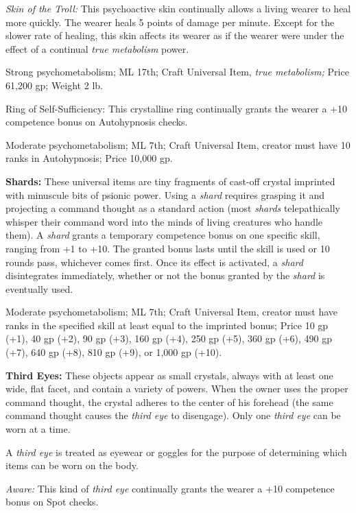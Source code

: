 \documentclass{article}
\begin{document}
\textit{Skin of the Troll: }This psychoactive skin continually allows a living 
wearer to heal more quickly. The wearer heals 5 points of damage per minute. Except 
for the slower rate of healing, this skin affects its wearer as if the wearer were 
under the effect of a continual \textit{true metabolism }power. 

Strong psychometabolism; ML 17th; Craft Universal Item, \textit{true metabolism; 
}Price 61,200 gp; Weight 2 lb.

Ring of Self-Sufficiency: This crystalline ring continually grants the wearer a 
+10 competence bonus on Autohypnosis checks.

Moderate psychometabolism; ML 7th; Craft Universal Item, creator must have 10 ranks 
in Autohypnosis; Price 10,000 gp.

\textbf{Shards:} These universal items are tiny fragments of cast-off crystal imprinted 
with minuscule bits of psionic power. Using a \textit{shard }requires grasping 
it and projecting a command thought as a standard action (most \textit{shards }telepathically 
whisper their command word into the minds of living creatures who handle them). 
A \textit{shard }grants a temporary competence bonus on one specific skill, ranging 
from +1 to +10. The granted bonus lasts until the skill is used or 10 rounds pass, 
whichever comes first. Once its effect is activated, a \textit{shard }disintegrates 
immediately, whether or not the bonus granted by the \textit{shard }is eventually 
used.

Moderate psychometabolism; ML 7th; Craft Universal Item, creator must have ranks 
in the specified skill at least equal to the imprinted bonus; Price 10 gp (+1), 
40 gp (+2), 90 gp (+3), 160 gp (+4), 250 gp (+5), 360 gp (+6), 490 gp (+7), 640 
gp (+8), 810 gp (+9), or 1,000 gp (+10). 

\textbf{Third Eyes: }These objects appear as small crystals, always with at least 
one wide, flat facet, and contain a variety of powers. When the owner uses the 
proper command thought, the crystal adheres to the center of his forehead (the 
same command thought causes the \textit{third eye }to disengage). Only one \textit{third 
eye }can be worn at a time.

A \textit{third eye }is treated as eyewear or goggles for the purpose of determining 
which items can be worn on the body.

\textit{Aware: }This kind of \textit{third eye }continually grants the wearer a 
+10 competence bonus on Spot checks.
\end{document}
